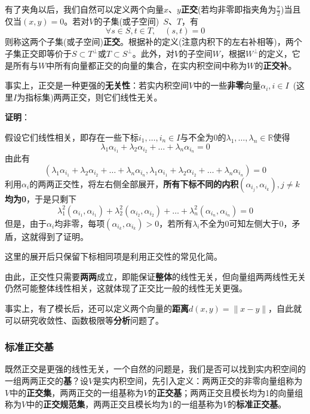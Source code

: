 \documentclass[a4paper,UTF8,fontset=windows,AutoFakeBold]{ctexart}
\newcommand*{\note}{\noindent *}
\newcommand{\proo}[1]{{\vspace{5pt}\kaishu\noindent\textbf{证明}：\vspace{-3pt}
\begin{compactitem}
    \item[] #1
\end{compactitem}
}}
\begin{document}
有了夹角以后，我们自然可以定义两个向量$x$、$y$\textbf{正交}(若均非零即指夹角为$\frac{\pi}{2}$)当且仅当$(x,y)=0$。若对$V$的子集(或子空间)\ $S$、$T$，有
$$\forall s\in S,t\in T,\quad (s,t)=0$$
则称这两个子集(或子空间)\textbf{正交}。根据补的定义(注意内积下的左右补相等)，两个子集正交即等价于$S\subset T^\bot$或$T\subset S^\bot$。此外，对$V$的子空间$W$，根据$W^\bot$的定义，它是所有与$W$中所有向量都正交的向量的集合，在实内积空间中称为$W$的\textbf{正交补}。

事实上，正交是一种更强的\textbf{无关性}：若实内积空间$V$中的一些\textbf{非零}向量$\alpha_i,i\in I$\ (这里$I$为指标集)两两正交，则它们线性无关。

\proo{
    假设它们线性相关，即存在一些下标$i_1,\dots,i_n\in I$与不全为0的$\lambda_1,\dots,\lambda_n\in\mathbb{R}$使得
    $$\lambda_1\alpha_{i_1}+\lambda_2\alpha_{i_2}+\dots+\lambda_n\alpha_{i_n}=0$$
    由此有
    $$(\lambda_1\alpha_{i_1}+\lambda_2\alpha_{i_2}+\dots+\lambda_n\alpha_{i_n},\lambda_1\alpha_{i_1}+\lambda_2\alpha_{i_2}+\dots+\lambda_n\alpha_{i_n})=0$$
    利用$\alpha_i$的两两正交性，将左右侧全部展开，\textbf{所有下标不同的内积$(\alpha_{i_j},\alpha_{i_k}),j\ne k$均为0}，于是只剩下
    $$\lambda_1^2(\alpha_{i_1},\alpha_{i_1})+\lambda_2^2(\alpha_{i_2},\alpha_{i_2})+\dots+\lambda_n^2(\alpha_{i_n},\alpha_{i_n})=0$$
    但是，由于$\alpha_i$均非零，每项$(\alpha_{i_k},\alpha_{i_k})>0$，若所有$\lambda_i$不全为0可知左侧大于0，矛盾，这就得到了证明。

    \note 这里的展开后只保留下标相同项是利用正交性的常见化简。
}

\note 由此，正交性只需要\textbf{两两}成立，即能保证\textbf{整体}的线性无关，但向量组两两线性无关仍然可能整体线性相关，这就体现了正交比一般的线性无关更强。

\note 事实上，有了模长后，还可以定义两个向量的\textbf{距离}$d(x,y)=\|x-y\|$，自此就可以研究收敛性、函数极限等\textbf{分析}问题了。

\subsubsection{标准正交基}
既然正交是更强的线性无关，一个自然的问题是，我们是否可以找到实内积空间的一组两两正交的\textbf{基}？设$V$是实内积空间，先引入定义：两两正交的非零向量组称为$V$中的\textbf{正交集}，两两正交的一组基称为$V$的\textbf{正交基}；两两正交且模长均为1的向量组称为$V$中的\textbf{正交规范集}，两两正交且模长均为1的一组基称为$V$的\textbf{标准正交基}。
\end{document}

